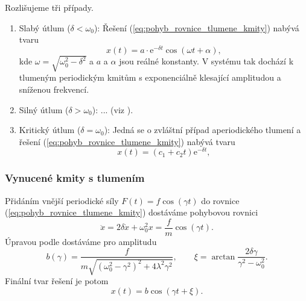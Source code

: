 \documentclass[english]{article}
\begin{document}
		Rozlišujeme tři případy.
		\begin{enumerate}
			\item Slabý útlum ($\delta < \omega_0$): Řešení (\ref{eq:pohyb_rovnice_tlumene_kmity}) nabývá tvaru
			\begin{equation}
			x(t) = a \cdot \mathrm{e}^{- \delta t} \cos ( \omega t + \alpha),
			\label{eq:fit_tlum}
			\end{equation}
			kde $\omega = \sqrt{\omega_0^2 - \delta^2}$ a $a$ a $\alpha$ jsou reálné konstanty. V systému tak dochází k tlumeným periodickým kmitům s exponenciálně klesající amplitudou a sníženou frekvencí. 
			
			\item Silný útlum ($\delta > \omega_0$): ... (viz \cite{bib:zadani_1}).

			\item Kritický útlum ($\delta = \omega_0$): Jedná se o zvláštní případ aperiodického tlumení a řešení (\ref{eq:pohyb_rovnice_tlumene_kmity}) nabývá tvaru
			\begin{equation}
			x(t) = (c_1 + c_2 t) \mathrm{e}^{- \delta t},
			\end{equation}
		\end{enumerate}

	\subsubsection{Vynucené kmity s tlumením}
		Přidáním vnější periodické síly $F(t) = f \cos (\gamma t)$ do rovnice (\ref{eq:pohyb_rovnice_tlumene_kmity}) dostáváme pohybovou rovnici
		\begin{equation}\label{eq:pohyb_rovnice_tlumene_kmity_buzene}
		\ddot{x} = 2 \delta \dot{x} + \omega_0^2 x = \frac{f}{m} \cos(\gamma t).
		\end{equation}
		Úpravou podle \cite{bib:zadani_1} dostáváme pro amplitudu 
		\begin{equation}
		b(\gamma) = \frac{f}{m \sqrt{(\omega_0^2-\gamma^2)^2+4\lambda^2\gamma^2}},
		\qquad
		\xi = \arctan \frac{2 \delta \gamma}{\gamma^2 - \omega_0^2}.
		\label{eq:fit_rezonance}
		\end{equation}
		Finální tvar řešení je potom 
		\begin{equation}
		x(t) = b \cos(\gamma t + \xi).
		\end{equation}
		
\end{document}
